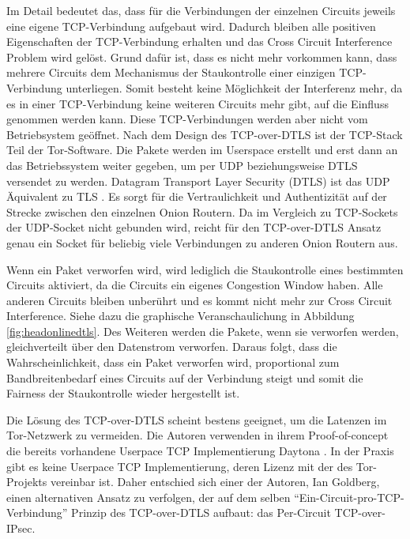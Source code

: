 \documentclass[fleqn,envcountsame,runningheads,10pt,a4paper]{llncs}
\begin{document}
Im Detail bedeutet das, dass für die Verbindungen der einzelnen Circuits jeweils 
eine eigene TCP-Verbindung aufgebaut wird. Dadurch bleiben alle positiven 
Eigenschaften der TCP-Verbindung erhalten und das Cross Circuit Interference 
Problem wird gelöst. Grund dafür ist, dass es nicht mehr vorkommen kann, dass 
mehrere Circuits dem Mechanismus der Staukontrolle einer einzigen TCP-Verbindung 
unterliegen. Somit besteht keine Möglichkeit der Interferenz mehr, da es in 
einer TCP-Verbindung keine weiteren Circuits mehr gibt, auf die Einfluss 
genommen werden kann. Diese TCP-Verbindungen werden aber nicht vom Betriebsystem 
geöffnet. Nach dem Design des TCP-over-DTLS ist der TCP-Stack Teil der 
Tor-Software. Die Pakete werden im Userspace erstellt und erst dann an das 
Betriebssystem weiter gegeben, um per UDP beziehungsweise DTLS versendet zu 
werden. Datagram Transport Layer Security (DTLS) ist das UDP Äquivalent zu TLS 
\cite{dtls}. Es sorgt für die Vertraulichkeit und Authentizität auf der Strecke 
zwischen den einzelnen Onion Routern. Da im Vergleich zu TCP-Sockets der 
UDP-Socket nicht gebunden wird, reicht für den TCP-over-DTLS Ansatz genau ein 
Socket für beliebig viele Verbindungen zu anderen Onion Routern aus.

Wenn ein Paket verworfen wird, wird lediglich die Staukontrolle eines bestimmten 
Circuits aktiviert, da die Circuits ein eigenes Congestion Window haben. Alle 
anderen Circuits bleiben unberührt und es kommt nicht mehr zur Cross Circuit 
Interference. Siehe dazu die graphische Veranschaulichung in Abbildung 
\ref{fig:headonlinedtls}. Des Weiteren werden die Pakete, wenn sie verworfen 
werden, gleichverteilt über den Datenstrom verworfen. Daraus folgt, dass die 
Wahrscheinlichkeit, dass ein Paket verworfen wird, proportional zum 
Bandbreitenbedarf eines Circuits auf der Verbindung steigt und somit die 
Fairness der Staukontrolle wieder hergestellt ist.

Die Lösung des TCP-over-DTLS scheint bestens geeignet, um die Latenzen im 
Tor-Netzwerk zu vermeiden. Die Autoren verwenden in ihrem Proof-of-concept die 
bereits vorhandene Userpace TCP Implementierung Daytona \cite{daytona}. In der 
Praxis gibt es keine Userpace TCP Implementierung, deren Lizenz mit der des 
Tor-Projekts vereinbar ist. Daher entschied sich einer der Autoren, Ian 
Goldberg, einen alternativen Ansatz zu verfolgen, der auf dem selben 
``Ein-Circuit-pro-TCP-Verbindung'' Prinzip des  TCP-over-DTLS aufbaut: das 
Per-Circuit TCP-over-IPsec. 
\end{document}
